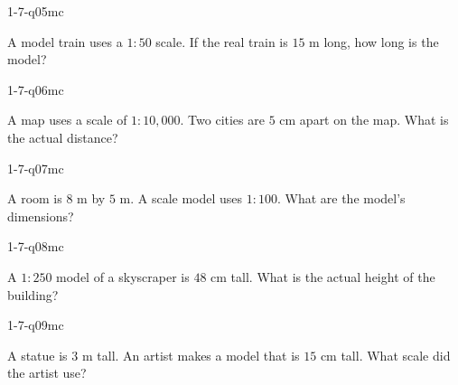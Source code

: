 \begin{practiceQuestion}{1-7-q05}{mc}
\begin{questionText}
A model train uses a $1 : 50$ scale. If the real train is $15$ m long, how long is the model?
\end{questionText}
\end{practiceQuestion}

\begin{practiceQuestion}{1-7-q06}{mc}
\begin{questionText}
A map uses a scale of $1 : 10{,}000$. Two cities are $5$ cm apart on the map. What is the actual distance?
\end{questionText}
\end{practiceQuestion}

\begin{practiceQuestion}{1-7-q07}{mc}
\begin{questionText}
A room is $8$ m by $5$ m. A scale model uses $1 : 100$. What are the model's dimensions?
\end{questionText}
\end{practiceQuestion}

\begin{practiceQuestion}{1-7-q08}{mc}
\begin{questionText}
A $1 : 250$ model of a skyscraper is $48$ cm tall. What is the actual height of the building?
\end{questionText}
\end{practiceQuestion}

\begin{practiceQuestion}{1-7-q09}{mc}
\begin{questionText}
A statue is $3$ m tall. An artist makes a model that is $15$ cm tall. What scale did the artist use?
\end{questionText}
\end{practiceQuestion}

